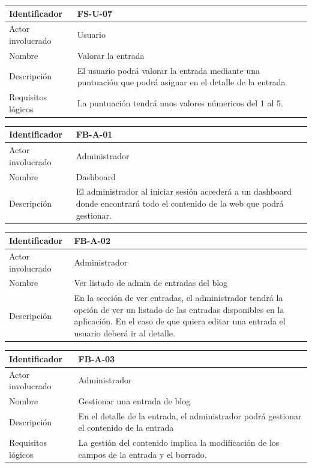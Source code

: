 \begin{table}[!htbp]
\centering
\begin{tabular}{|p{3cm}|p{10cm}|}
\hline
Identificador & FS-U-07 \\ \hline
Actor involucrado & Usuario \\ \hline
Nombre & Valorar la entrada\\ \hline
Descripción & El usuario podrá valorar la entrada mediante una puntuación que podrá asignar en el detalle de la entrada  \\ \hline
Requisitos lógicos & La puntuación tendrá unos valores númericos del 1 al 5.\\ \hline
\end{tabular}
\end{table}

\begin{table}[!htbp]
\centering
\begin{tabular}{|p{3cm}|p{10cm}|}
\hline
Identificador & FB-A-01 \\ \hline
Actor involucrado & Administrador \\ \hline
Nombre & Dashboard\\ \hline
Descripción & El administrador al iniciar sesión accederá a un dashboard donde encontrará todo el contenido de la web que podrá gestionar.\\ \hline
\end{tabular}
\end{table}

\begin{table}[!htbp]
\centering
\begin{tabular}{|p{3cm}|p{10cm}|}
\hline
Identificador & FB-A-02 \\ \hline
Actor involucrado & Administrador \\ \hline
Nombre & Ver listado de admin de entradas del blog\\ \hline
Descripción & En la sección de ver entradas, el administrador tendrá la opción de ver un listado de las entradas disponibles en la aplicación. En el caso de que quiera editar una entrada el usuario deberá ir al detalle. \\ \hline

\end{tabular}
\end{table}

\begin{table}[!htbp]
\centering
\begin{tabular}{|p{3cm}|p{10cm}|}
\hline
Identificador & FB-A-03 \\ \hline
Actor involucrado & Administrador \\ \hline
Nombre & Gestionar una entrada de blog\\ \hline
Descripción & En el detalle de la entrada, el administrador podrá gestionar el contenido de la entrada  \\ \hline
Requisitos lógicos & La gestión del contenido implica la modificación de los campos de la entrada y el borrado. \\ \hline
\end{tabular}
\end{table}

